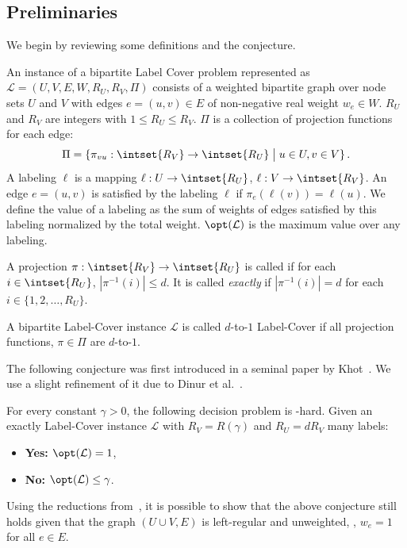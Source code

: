 \subsection{Preliminaries}
\label{sec:condhardness}
%
We begin by reviewing some definitions
%
and the  conjecture.
%
\begin{definition}
  An instance of a bipartite Label Cover problem represented as
  $\mathcal{L} = (U, V, E, W, R_U, R_V, \Pi)$ consists of a weighted
  bipartite graph over node sets $U$ and $V$ with edges $e=(u,v) \in
  E$ of non-negative real weight $w_e \in W$. $R_U$ and $R_V$ are
  integers with $1\le R_U\le R_V$. $\Pi$ is a collection of projection
  functions for each edge:
  \[
  \Pi=\{\pi_{vu}:\intset{R_V}\rightarrow\intset{R_U}\;\big|\;u\in U, v\in
  V\}\,.
  \]
  A labeling $\ell$ is a mapping $\ell:U\rightarrow
  \intset{R_U}$, $\ell:V\rightarrow \intset{R_V}$. An edge $e=(u,v)$
  is satisfied by the labeling $\ell$ if $\pi_e(\ell(v))=\ell(u)$. We
  define the value of a labeling as the sum of weights of edges
  satisfied by this labeling normalized by the total
  weight. $\opt(\mathcal{L})$ is the maximum value over any labeling.
\end{definition}
%
%
\begin{definition}
  A projection $\pi:\intset{R_V}\rightarrow \intset{R_U}$ is called
   if for each $i \in \intset{R_U}$, $|\pi^{-1}(i)|\le
  d$. It is called \emph{exactly}  if $|\pi^{-1}(i)|= d$ for
  each $i \in \{1,2,\dots,R_U\}$.
\end{definition}
%
%
\begin{definition}
  A bipartite Label-Cover instance $\mathcal{L}$ is called $d$-to-$1$
  Label-Cover if all projection functions, $\pi \in \Pi$ are
  $d$-to-$1$.
\end{definition}
%
The following conjecture was first introduced in a seminal paper by
Khot~\cite{Khot02}. We use a slight refinement of it due to
Dinur et al.~\cite{DMR}.
\begin{conjecture}
  For every constant $\gamma > 0$, the following decision problem is -hard.
  Given an exactly  Label-Cover instance
  $\mathcal{L}$ with $R_V=R(\gamma)$ and $R_U = d R_V$ many labels:
  \begin{itemize}
  \item {\bf Yes:} $\opt(\mathcal{L}) = 1$,
  \item {\bf No:} $\opt(\mathcal{L})\le \gamma$.
  \end{itemize}
%
%
%
%
%
%
\label{conj:dtoone}
\end{conjecture}
%
Using the reductions from~\cite{DMR}, it is possible to show that the
above conjecture still holds given that the graph $(U\cup V, E)$ is
left-regular and unweighted, \ie, $w_e = 1$ for all $e\in E$.
%
